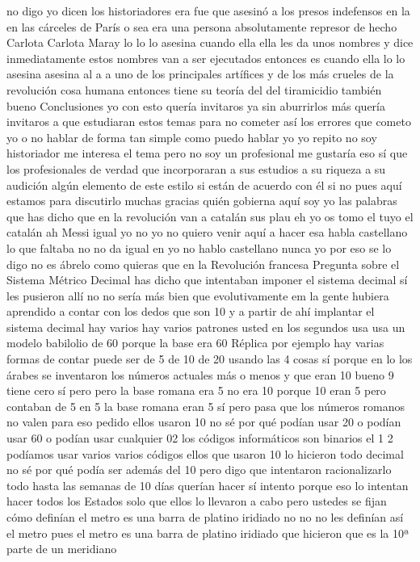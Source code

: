no digo yo dicen los historiadores era fue que asesinó a los presos indefensos en la en las cárceles de París
o sea era una persona absolutamente represor de hecho Carlota Carlota Maray lo lo
lo asesina cuando ella ella les da unos nombres y dice inmediatamente estos nombres van a ser ejecutados entonces es cuando ella lo
lo asesina asesina al a a uno de los principales artífices y de los más crueles de la revolución
cosa humana entonces tiene su teoría del del tiramicidio también bueno
Conclusiones
yo con esto quería invitaros ya sin aburrirlos más quería invitaros a que estudiaran estos temas para no cometer así los errores que cometo yo
o no hablar de forma tan simple como puedo hablar yo yo repito no soy historiador me interesa el tema
pero no soy un profesional me gustaría eso sí que los profesionales de verdad que incorporaran a sus estudios
a su riqueza a su audición algún elemento de este estilo si están de acuerdo con él si no pues aquí estamos para discutirlo muchas gracias
quién gobierna aquí soy yo las palabras
que has dicho que en la revolución van a catalán sus plau eh yo os tomo el tuyo el catalán ah Messi igual yo no
yo no quiero venir aquí a hacer esa habla castellano lo que faltaba no no da igual en
yo no hablo castellano nunca yo por eso se lo digo no es ábrelo como quieras que en la Revolución francesa
Pregunta sobre el Sistema Métrico Decimal
has dicho que intentaban imponer el sistema decimal sí les pusieron allí
no no sería más bien que evolutivamente
em la gente hubiera aprendido a contar con los dedos que son 10 y a partir de ahí implantar el sistema decimal
hay varios hay varios patrones usted en los segundos usa usa un modelo babilolio de 60 porque la base era 60
Réplica
por ejemplo hay varias formas de contar puede ser de 5 de 10 de 20 usando las 4 cosas
sí porque en lo los árabes se inventaron los números actuales más o menos
y que eran 10 bueno 9 tiene cero sí pero pero la base romana era 5
no era 10 porque 10 eran 5 pero contaban de 5 en 5 la base romana eran 5 sí
pero pasa que los números romanos no valen para eso pedido ellos usaron 10 no sé por qué podían usar 20
o podían usar 60 o podían usar cualquier 02 los códigos informáticos son binarios el 1 2
podíamos usar varios varios códigos ellos que usaron 10 lo hicieron todo decimal no sé por qué podía ser además del 10
pero digo que intentaron racionalizarlo todo hasta las semanas de 10 días querían hacer
sí intento porque eso lo intentan hacer todos los Estados solo que ellos lo llevaron a cabo pero ustedes se fijan cómo definían el metro
es una barra de platino iridiado no no no les definían así el metro pues el metro es una barra de platino iridiado que hicieron que es la 10ª parte de un meridiano
